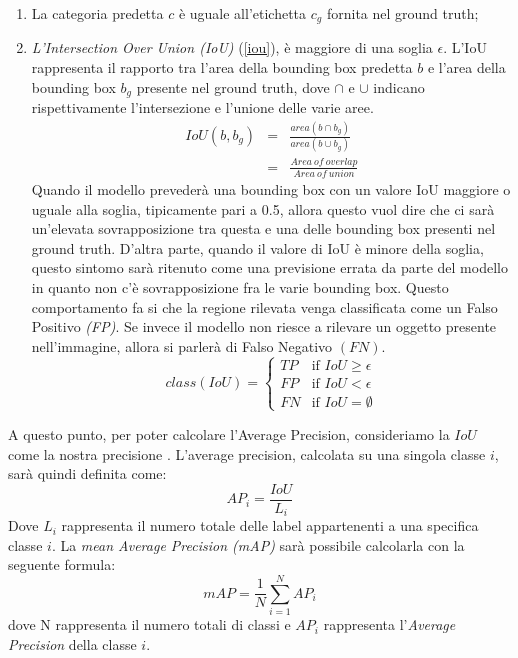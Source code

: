 \begin{enumerate}
    \item La categoria predetta $c$ è uguale all'etichetta $c_g$ fornita nel ground truth;
    \item \emph{L'Intersection Over Union (IoU)} (\ref{iou}), è maggiore di una soglia $\epsilon$. L'IoU 
    rappresenta il rapporto tra l'area della bounding box predetta $b$ e l'area 
    della bounding box $b_g$ presente nel ground truth, dove $\cap$ e $\cup$ indicano 
    rispettivamente l'intersezione e l'unione delle varie aree.
    \begin{eqnarray}\label{iou}
        IoU(b,b_g) & = & \frac{area(b \cap b_g)}{area(b \cup b_g)} \nonumber \\
                 & = & \frac{Area \ of \ overlap}{Area \ of \ union}
    \end{eqnarray}
    Quando il modello prevederà una bounding box con un valore IoU maggiore 
    o uguale alla soglia,  tipicamente pari a 0.5, allora questo vuol dire che ci 
    sarà un'elevata sovrapposizione tra questa e una delle bounding box presenti 
    nel ground truth. D'altra parte, quando il valore di IoU è minore della 
    soglia, questo sintomo sarà ritenuto come una previsione errata da parte 
    del modello in quanto non c'è sovrapposizione fra le varie bounding box. 
    Questo comportamento fa si che la regione rilevata venga classificata come 
    un Falso Positivo \emph{(FP)}. Se invece il modello non riesce a rilevare un oggetto 
    presente nell'immagine, allora si parlerà di Falso Negativo $(FN)$.
    \begin{equation}\label{iou values}
        class(IoU) = \left\{
            \begin{array}{rl}
            TP & \mbox{if } IoU \geq \epsilon \\
            FP & \mbox{if } IoU < \epsilon \\
            FN & \mbox{if } IoU = \emptyset
            \end{array}
            \right.
    \end{equation}
\end{enumerate}
A questo punto, per poter calcolare l'Average Precision, consideriamo la $IoU$ come 
la nostra precisione \cite{rosebrock2017deep}. L'average precision, calcolata su una singola classe $i$, sarà 
quindi definita come:
\begin{equation}\label{average precision}
    AP_i = \frac{IoU}{L_i}
\end{equation}
Dove $L_i$ rappresenta il numero totale delle label appartenenti a una specifica classe 
$i$. La \emph{mean Average Precision (mAP)} sarà possibile calcolarla con la seguente formula:
\begin{equation}\label{mean average precision}
    mAP = \frac{1}{N}\sum_{i=1}^NAP_i
\end{equation}
dove N rappresenta il numero totali di classi e $AP_i$ rappresenta l'\emph{Average Precision} 
della classe $i$.

